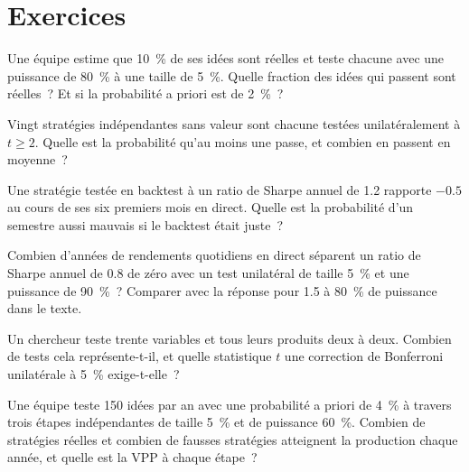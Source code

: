 \section{Exercices}

\begin{exercise}[$\star$]\label{exo:rs:the-research-process:1}
Une équipe estime que 10~\% de ses idées sont réelles et teste chacune avec une puissance de 80~\% à une taille de 5~\%. Quelle fraction des idées qui passent
sont réelles~? Et si la probabilité a priori est de 2~\%~?
\end{exercise}

\begin{exercise}[$\star$]\label{exo:rs:the-research-process:2}
Vingt stratégies indépendantes sans valeur sont chacune testées unilatéralement à $t \ge 2$. Quelle est la probabilité qu'au moins une
passe, et combien en passent en moyenne~?
\end{exercise}

\begin{exercise}[$\star$]\label{exo:rs:the-research-process:3}
Une stratégie testée en backtest à un ratio de Sharpe annuel de 1.2 rapporte $-0.5$ au cours de ses six premiers mois en direct. Quelle est la probabilité d'un semestre
aussi mauvais si le backtest était juste~?
\end{exercise}

\begin{exercise}[$\star\star$]\label{exo:rs:the-research-process:4}
Combien d'années de rendements quotidiens en direct séparent un ratio de Sharpe annuel de 0.8 de zéro avec un test unilatéral de taille 5~\% et une puissance de
90~\%~? Comparer avec la réponse pour 1.5 à 80~\% de puissance dans le texte.
\end{exercise}

\begin{exercise}[$\star\star$]\label{exo:rs:the-research-process:5}
Un chercheur teste trente variables et tous leurs produits deux à deux. Combien de tests cela représente-t-il, et quelle statistique $t$ une
correction de Bonferroni unilatérale à 5~\% exige-t-elle~?
\end{exercise}

\begin{exercise}[$\star\star$]\label{exo:rs:the-research-process:6}
Une équipe teste 150 idées par an avec une probabilité a priori de 4~\% à travers trois étapes indépendantes de taille 5~\% et de puissance 60~\%. Combien de stratégies réelles et
combien de fausses stratégies atteignent la production chaque année, et quelle est la VPP à chaque étape~?
\end{exercise}

